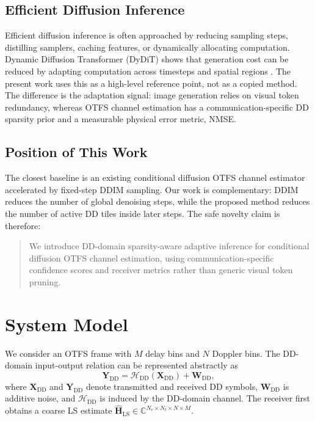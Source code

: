 \documentclass[10pt,journal]{IEEEtran}
\newcommand{\mat}[1]{\mathbf{#1}}
\newcommand{\dd}{\mathrm{DD}}
\begin{document}
\subsection{Efficient Diffusion Inference}

Efficient diffusion inference is often approached by reducing sampling steps,
distilling samplers, caching features, or dynamically allocating computation.
Dynamic Diffusion Transformer (DyDiT) shows that generation cost can be reduced
by adapting computation across timesteps and spatial regions
\cite{zhao2025dydit}. The present work uses this as a high-level reference
point, not as a copied method. The difference is the adaptation signal: image
generation relies on visual token redundancy, whereas OTFS channel estimation
has a communication-specific DD sparsity prior and a measurable physical error
metric, NMSE.

\subsection{Position of This Work}

The closest baseline is an existing conditional diffusion OTFS channel
estimator accelerated by fixed-step DDIM sampling. Our work is complementary:
DDIM reduces the number of global denoising steps, while the proposed method
reduces the number of active DD tiles inside later steps. The safe novelty claim
is therefore:

\begin{quote}
We introduce DD-domain sparsity-aware adaptive inference for conditional
diffusion OTFS channel estimation, using communication-specific confidence
scores and receiver metrics rather than generic visual token pruning.
\end{quote}

\section{System Model}

We consider an OTFS frame with $M$ delay bins and $N$ Doppler bins. The
DD-domain input-output relation can be represented abstractly as
\begin{equation}
  \mat{Y}_{\dd} = \mathcal{H}_{\dd}(\mat{X}_{\dd}) + \mat{W}_{\dd},
  \label{eq:otfs_input_output}
\end{equation}
where $\mat{X}_{\dd}$ and $\mat{Y}_{\dd}$ denote transmitted and received DD
symbols, $\mat{W}_{\dd}$ is additive noise, and $\mathcal{H}_{\dd}$ is induced
by the DD-domain channel. The receiver first obtains a coarse LS estimate
$\hat{\mat{H}}_{\mathrm{LS}}\in\mathbb{C}^{N_r\times N_t\times N\times M}$.
\end{document}
